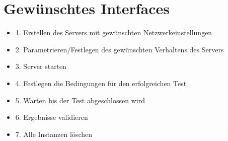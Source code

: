 \section{Gewünschtes Interfaces}
    \begin{itemize}
        \item 1. Erstellen des Servers mit gewünschten Netzwerkeinstellungen
        \item 2. Parametrieren/Festlegen des gewünschten Verhaltens des Servers
        \item 3. Server starten
        \item 4. Festlegen die Bedingungen für den erfolgreichen Test 
        \item 5. Warten bis der Test abgeschlossen wird
        \item 6. Ergebnisse validieren
        \item 7. Alle Instanzen löschen
    \end{itemize}


